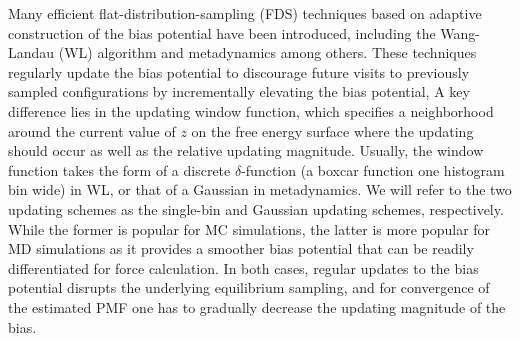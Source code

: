 \documentclass[reprint, superscriptaddress, floatfix]{revtex4-1}
\begin{document}
Many efficient flat-distribution-sampling (FDS) techniques
based on adaptive construction of the bias potential
have been introduced,
including the Wang-Landau (WL) algorithm\cite{
  wang2001, *wang2001pre}
and metadynamics\cite{huber1994,
  *laio2002, *laio2008, *barducci2011, *sutto2012, micheletti2004}
among others\cite{kim2006, *kim2007, junghans2014,
  langfeld2012, pellegrini2014}.
%
%
These techniques regularly update the bias potential
to discourage future visits to previously sampled configurations
by incrementally elevating the bias potential,
%
%
A key difference lies
in the updating window function,
which specifies
a neighborhood around the current value of
$z$ on the free energy surface
where the updating should occur
as well as the relative updating magnitude.
%
Usually, the window function
takes the form of a discrete
$\delta$-function (a boxcar function one histogram bin wide)
in WL,
or that of a Gaussian
in metadynamics.
%
We will refer to the two updating schemes
as the single-bin
and Gaussian updating schemes, respectively.
%
While the former is popular for MC simulations\cite{wang2001,
  wang2001pre, kim2006, *kim2007},
the latter is more popular for MD simulations
as it provides a smoother bias potential
that can be readily differentiated for force calculation.\cite{huber1994,
  *laio2002, *laio2008, *barducci2011, *sutto2012, junghans2014}
%
%
In both cases,
regular updates to the bias potential
disrupts the underlying equilibrium
sampling\cite{zhou2005, morozov2007, zhou2008},
and for convergence of the estimated PMF
one  has to gradually decrease
the updating magnitude of the bias.
\end{document}
